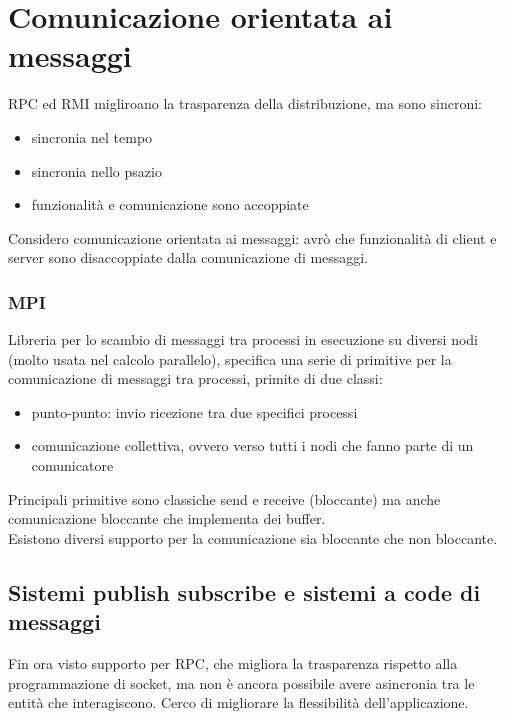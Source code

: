\documentclass{article}
\begin{document}
\section{Comunicazione orientata ai messaggi}
RPC ed RMI migliroano la trasparenza della distribuzione, ma sono sincroni:
\begin{itemize}
\item sincronia nel tempo
\item sincronia nello psazio
\item funzionalità e comunicazione sono accoppiate
\end{itemize}
Considero comunicazione orientata ai messaggi: avrò che funzionalità di client e server sono disaccoppiate dalla comunicazione di messaggi.\\
\subsubsection{MPI}
Libreria per lo scambio di messaggi tra processi in esecuzione su diversi nodi (molto usata nel calcolo parallelo), specifica una serie di primitive per la comunicazione di messaggi tra processi, primite di due classi:
\begin{itemize}
\item punto-punto: invio ricezione tra due specifici processi
\item comunicazione collettiva, ovvero verso tutti i nodi che fanno parte di un comunicatore
\end{itemize}
Principali primitive sono classiche send e receive (bloccante) ma anche comunicazione bloccante che implementa dei buffer.\\ Esistono diversi supporto per la comunicazione sia bloccante che non bloccante.
\subsection{Sistemi publish subscribe e sistemi a code di messaggi}
Fin ora visto supporto per RPC, che migliora la trasparenza rispetto alla programmazione di socket, ma non è ancora possibile avere asincronia tra le entità che interagiscono. Cerco di migliorare la flessibilità dell'applicazione.
\end{document}
